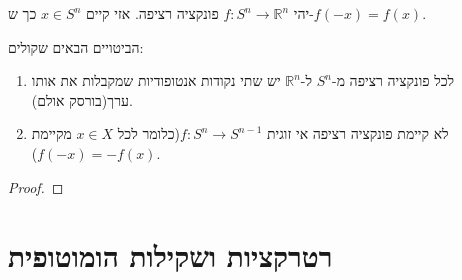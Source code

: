 \documentclass{tstextbook}
\begin{document}
\begin{theorem}
יהי \(f:S^{n}\to \mathbb{R}^{n}\) פונקציה רציפה. אזי קיים \(x \in S^{n}\) כך ש-\(f(-x)=f(x)\).

\end{theorem}
\begin{proposition}
הביטויים הבאים שקולים:

  \begin{enumerate}
    \item לכל פונקציה רציפה מ-\(S^{n}\) ל-\(\mathbb{R}^{n}\) יש שתי נקודות אנטופודיות שמקבלות את אותו ערך(בורסק אולם). 


    \item לא קיימת פונקציה רציפה אי זוגית \(f:S^{n}\to S^{n-1}\)(כלומר לכל \(x \in X\) מקיימת \(f(-x)=-f(x)\)).  


  \end{enumerate}
\end{proposition}
\begin{proof}
\end{proof}
\section{רטרקציות ושקילות הומוטופית}
\end{document}
